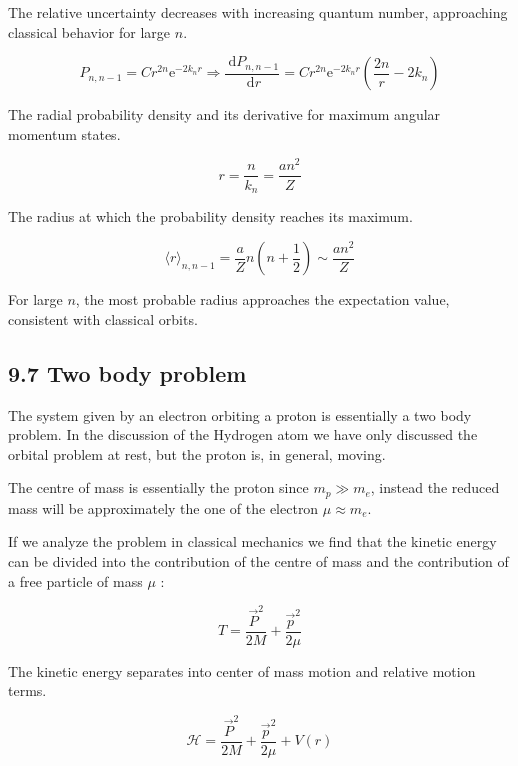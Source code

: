 \documentclass[italian]{HKNdocument}
\begin{document}
The relative uncertainty decreases with increasing quantum number, approaching classical behavior for large $n$.

\begin{equation*}
P_{n, n-1}=C r^{2 n} \mathrm{e}^{-2 k_{n} r} \Longrightarrow \frac{\mathrm{~d} P_{n, n-1}}{\mathrm{~d} r}=C r^{2 n} \mathrm{e}^{-2 k_{n} r}\left(\frac{2 n}{r}-2 k_{n}\right) \tag{9.105}
\end{equation*}

The radial probability density and its derivative for maximum angular momentum states.

\begin{equation*}
r=\frac{n}{k_{n}}=\frac{a n^{2}}{Z} \tag{9.106}
\end{equation*}

The radius at which the probability density reaches its maximum.

\begin{equation*}
\langle r\rangle_{n, n-1}=\frac{a}{Z} n\left(n+\frac{1}{2}\right) \sim \frac{a n^{2}}{Z} \tag{9.107}
\end{equation*}

For large $n$, the most probable radius approaches the expectation value, consistent with classical orbits.

\subsection*{9.7 Two body problem}
The system given by an electron orbiting a proton is essentially a two body problem. In the discussion of the Hydrogen atom we have only discussed the orbital problem at rest, but the proton is, in general, moving.

The centre of mass is essentially the proton since $m_{p} \gg m_{e}$, instead the reduced mass will be approximately the one of the electron $\mu \approx m_{e}$.

If we analyze the problem in classical mechanics we find that the kinetic energy can be divided into the contribution of the centre of mass and the contribution of a free particle of mass $\mu$ :

\begin{equation*}
T=\frac{\vec{P}^{2}}{2 M}+\frac{\vec{p}^{2}}{2 \mu} \tag{9.108}
\end{equation*}

The kinetic energy separates into center of mass motion and relative motion terms.

\begin{equation*}
\mathcal{H}=\frac{\vec{P}^{2}}{2 M}+\frac{\vec{p}^{2}}{2 \mu}+V(r) \tag{9.109}
\end{equation*}
\end{document}
